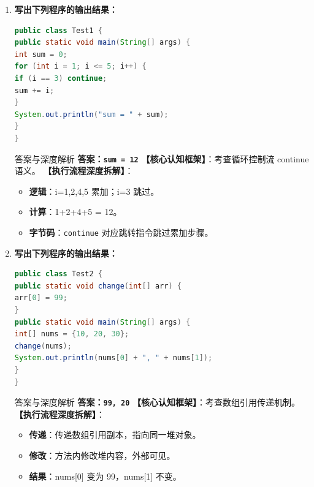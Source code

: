 ﻿\documentclass[12pt, a4paper]{ctexart}
\newcommand{\code}[1]{\texttt{#1}}
\begin{document}
\begin{enumerate}[label=\textbf{\arabic*.}, leftmargin=*, itemsep=1.5em]
	\item \textbf{写出下列程序的输出结果：}
	      \begin{lstlisting}[language=Java]
public class Test1 {
public static void main(String[] args) {
int sum = 0;
for (int i = 1; i <= 5; i++) {
if (i == 3) continue;
sum += i;
}
System.out.println("sum = " + sum);
}
}
\end{lstlisting}
	      \begin{bluebox}{答案与深度解析}
		      \textbf{答案：\code{sum = 12}}
		      \textbf{【核心认知框架】}：考查循环控制流 continue 语义。
		      \textbf{【执行流程深度拆解】}：
		      \begin{itemize}[leftmargin=*, nosep]
			      \item \textbf{逻辑}：i=1,2,4,5 累加；i=3 跳过。
			      \item \textbf{计算}：1+2+4+5 = 12。
			      \item \textbf{字节码}：\code{continue} 对应跳转指令跳过累加步骤。
		      \end{itemize}
	      \end{bluebox}

	\item \textbf{写出下列程序的输出结果：}
	      \begin{lstlisting}[language=Java]
public class Test2 {
public static void change(int[] arr) {
arr[0] = 99;
}
public static void main(String[] args) {
int[] nums = {10, 20, 30};
change(nums);
System.out.println(nums[0] + ", " + nums[1]);
}
}
\end{lstlisting}
	      \begin{bluebox}{答案与深度解析}
		      \textbf{答案：\code{99, 20}}
		      \textbf{【核心认知框架】}：考查数组引用传递机制。
		      \textbf{【执行流程深度拆解】}：
		      \begin{itemize}[leftmargin=*, nosep]
			      \item \textbf{传递}：传递数组引用副本，指向同一堆对象。
			      \item \textbf{修改}：方法内修改堆内容，外部可见。
			      \item \textbf{结果}：nums[0] 变为 99，nums[1] 不变。
		      \end{itemize}
	      \end{bluebox}


\end{enumerate}
\end{document}
